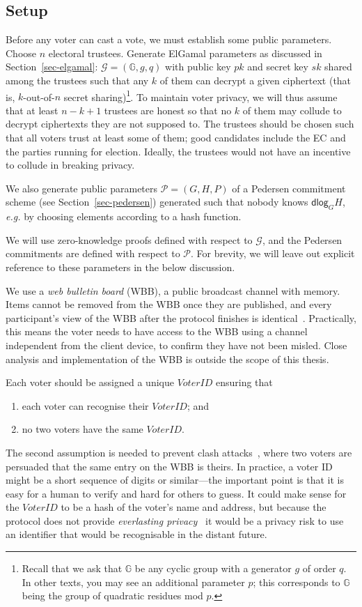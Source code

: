 \documentclass[12pt,a4paper]{article}
\theoremstyle{definition}
\newcommand{\VoterID}{\mathit{VoterID}}
\newcommand{\eg}{\textit{e.g. }}
\begin{document}
\subsection{Setup}
Before any voter can cast a vote, we must establish some public parameters. Choose $n$ electoral trustees. Generate ElGamal parameters as discussed in Section~\ref{sec-elgamal}: $\mathcal{G} = (\mathbb{G}, g, q)$ with public key $pk$ and secret key $sk$ shared among the trustees such that any $k$ of them can decrypt a given ciphertext (that is, $k$-out-of-$n$ secret sharing)\footnote{Recall that we ask that $\mathbb{G}$ be any cyclic group with a generator $g$ of order $q$. In other texts, you may see an additional parameter $p$; this corresponds to $\mathbb{G}$ being the group of quadratic residues mod $p$.}. To maintain voter privacy, we will thus assume that at least $n - k + 1$ trustees are honest so that no $k$ of them may collude to decrypt ciphertexts they are not supposed to. The trustees should be chosen such that all voters trust at least some of them; good candidates include the EC and the parties running for election. Ideally, the trustees would not have an incentive to collude in breaking privacy.

We also generate public parameters $\mathcal{P}=(G, H, P)$ of a Pedersen commitment scheme (see Section~\ref{sec-pedersen}) generated such that nobody knows $\mathsf{dlog}_G{H}$, \eg by choosing elements according to a hash function.

We will use zero-knowledge proofs defined with respect to $\mathcal{G}$, and the Pedersen commitments are defined with respect to $\mathcal{P}$. For brevity, we will leave out explicit reference to these parameters in the below discussion.

We use a \textit{web bulletin board} (WBB), a public broadcast channel with memory. Items cannot be removed from the WBB once they are published, and every participant's view of the WBB after the protocol finishes is identical~\cite{culnane2014peered,hirschi2020fixing}. Practically, this means the voter needs to have access to the WBB using a channel independent from the client device, to confirm they have not been misled. Close analysis and implementation of the WBB is outside the scope of this thesis.

Each voter should be assigned a unique $\VoterID$ ensuring that
\begin{enumerate}
    \item each voter can recognise their $\VoterID$; and
    \item no two voters have the same $\VoterID$.
\end{enumerate}
The second assumption is needed to prevent clash attacks~\cite{kusters2012clash}, where two voters are persuaded that the same entry on the WBB is theirs. In practice, a voter ID might be a short sequence of digits or similar---the important point is that it is easy for a human to verify and hard for others to guess. It could make sense for the $\VoterID$ to be a hash of the voter's name and address, but because the protocol does not provide \textit{everlasting privacy}~\cite{moran2006receipt} it would be a privacy risk to use an identifier that would be recognisable in the distant future.
\end{document}
